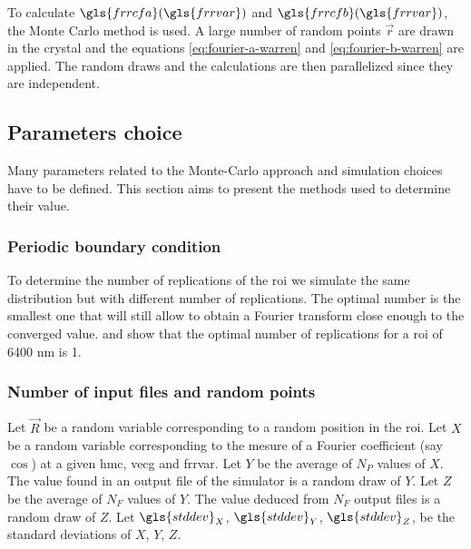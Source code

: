 To calculate \( \gls{frrcfa}(\gls{frrvar}) \) and \( \gls{frrcfb}(\gls{frrvar}) \), the Monte Carlo method is used.
A large number of random points \( \vec{r} \) are drawn in the crystal and the equations \eqref{eq:fourier-a-warren} and \eqref{eq:fourier-b-warren} are applied. The random draws and the calculations are then parallelized since they are independent.

\subsection{Parameters choice}

Many parameters related to the Monte-Carlo approach and simulation choices have to be defined.
This section aims to present the methods used to determine their value.

\subsubsection{Periodic boundary condition}

To determine the number of replications of the \gls{roi} we simulate the same distribution but with different number of replications.
The optimal number is the smallest one that will still allow to obtain a Fourier transform close enough to the converged value.
 and  show that the optimal number of replications for a \gls{roi} of 6400 nm is 1.

%
%

\subsubsection{Number of input files and random points}

Let \( \vec{R} \) be a random variable corresponding to a random position in the \gls{roi}.
Let \( X \) be a random variable corresponding to the mesure of a Fourier coefficient (say \( \cos \)) at a given \gls{hmc}, \gls{vecg} and \gls{frrvar}.
Let \( Y \) be the average of \( N_P \) values of \( X \).
The value found in an output file of the simulator is a random draw of \( Y \).
Let \( Z \) be the average of \( N_F \) values of \( Y \).
The value deduced from \( N_F \) output files is a random draw of \( Z \).
Let \( \gls{stddev}_X \), \( \gls{stddev}_Y \), \( \gls{stddev}_Z \), be the standard deviations of \( X \), \( Y \), \( Z \).

